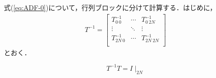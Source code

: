 \documentclass[11pt,a4paper]{jsarticle}
\theoremstyle{definition}
\begin{document}
式(\ref{eq:ADF-0})について，行列ブロックに分けて計算する．はじめに，
\begin{equation*}
  \begin{split}
    T^{-1}
    =\begin{bmatrix}
      T^{-1}_{0\ 0} & \cdots & T^{-1}_{0\ 2N} \\
      \vdots & \ddots & \vdots \\
      T^{-1}_{2N\ 0} & \cdots & T^{-1}_{2N\ 2N} \\
    \end{bmatrix}
  \end{split}
\end{equation*}
とおく．

\begin{equation}
  T^{-1}T = I \mid_{2N}
\end{equation}
\end{document}

